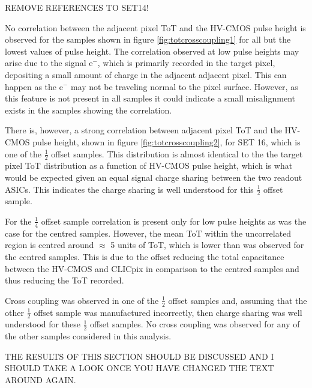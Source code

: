 REMOVE REFERENCES TO SET14!

No correlation between the adjacent pixel ToT and the HV-CMOS pulse height is observed for the samples shown in figure \ref{fig:totcrosscoupling1} for all but the lowest values of pulse height.  The correlation observed at low pulse heights may arise due to the signal $\text{e}^{-}$, which is primarily recorded in the target pixel, depositing a small amount of charge in the adjacent adjacent pixel.  This can happen as the $\text{e}^{-}$ may not be traveling normal to the pixel surface.  However, as this feature is not present in all samples it could indicate a small misalignment exists in the samples showing the correlation.  

There is, however, a strong correlation between adjacent pixel ToT and the HV-CMOS pulse height, shown in figure \ref{fig:totcrosscoupling2}, for SET 16, which is one of the $\frac{1}{2}$ offset samples.  This distribution is almost identical to the the target pixel ToT distribution as a function of HV-CMOS pulse height, which is what would be expected given an equal signal charge sharing between the two readout ASICs.  This indicates the charge sharing is well understood for this $\frac{1}{2}$ offset sample.   

For the $\frac{1}{4}$ offset sample correlation is present only for low pulse heights as was the case for the centred samples.  However, the mean ToT within the uncorrelated region is centred around $\approx$ 5 units of ToT, which is lower than was observed for the centred samples.  This is due to the offset reducing the total capacitance between the HV-CMOS and CLICpix in comparison to the centred samples and thus reducing the ToT recorded.

Cross coupling was observed in one of the $\frac{1}{2}$ offset samples and, assuming that the other $\frac{1}{2}$ offset sample was manufactured incorrectly, then charge sharing was well understood for these $\frac{1}{2}$ offset samples.  No cross coupling was observed for any of the other samples considered in this analysis.  

THE RESULTS OF THIS SECTION SHOULD BE DISCUSSED AND I SHOULD TAKE A LOOK ONCE YOU HAVE CHANGED THE TEXT AROUND AGAIN.

